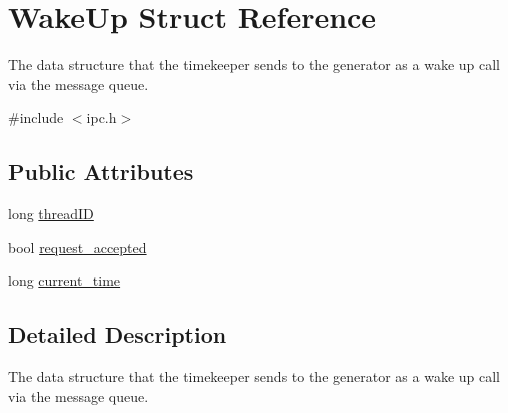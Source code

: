 \hypertarget{structWakeUp}{\section{\-Wake\-Up \-Struct \-Reference}
\label{structWakeUp}
}


\-The data structure that the timekeeper sends to the generator as a wake up call via the message queue.  




{\ttfamily \#include $<$ipc.\-h$>$}

\subsection*{\-Public \-Attributes}
\begin{DoxyCompactItemize}
\item 
long \hyperlink{structWakeUp_a940f846cbf0d72532d67c185ad7f0531}{thread\-I\-D}
\item 
bool \hyperlink{structWakeUp_af12d17da0cc6f71e9794faffc3636dcd}{request\-\_\-accepted}
\item 
long \hyperlink{structWakeUp_aac900a0e75f73fb4683c889020459be9}{current\-\_\-time}
\end{DoxyCompactItemize}


\subsection{\-Detailed \-Description}
\-The data structure that the timekeeper sends to the generator as a wake up call via the message queue. 

